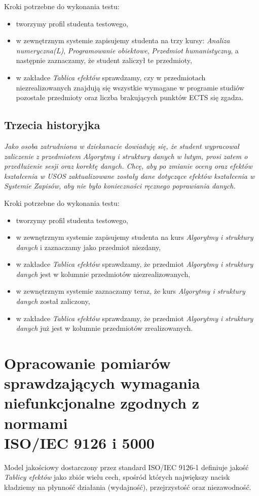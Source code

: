 \documentclass{article}
\begin{document}
\medskip
\noindent Kroki potrzebne do wykonania testu:
\begin{itemize}
 \item tworzymy profil studenta testowego,
 \item w zewnętrznym systemie zapisujemy studenta na trzy kursy: \textit{Analiza numeryczna(L)}, \textit{Programowanie obiektowe}, \textit{Przedmiot humanistyczny}, a następnie zaznaczamy, że student zaliczył te przedmioty,
 \item w zakładce \textit{Tablica efektów} sprawdzamy, czy w przedmiotach niezrealizowanych znajdują się wszystkie wymagane w programie studiów pozostałe przedmioty oraz
 liczba brakujących punktów ECTS się zgadza.
\end{itemize}

\subsection{Trzecia historyjka}
\textit{Jako osoba zatrudniona w dziekanacie dowiaduję się, że student wypracował zaliczenie z przedmiotem \textnormal{Algorytmy i struktury danych} w lutym, prosi zatem o przedłużenie sesji oraz korektę danych. 
Chcę, aby po zmianie oceny oraz efektów kształcenia w USOS zaktualizowane zostały dane dotyczące efektów kształcenia w Systemie Zapisów, aby nie było konieczności ręcznego poprawiania danych.}

\medskip
\noindent Kroki potrzebne do wykonania testu:
\begin{itemize}
 \item tworzymy profil studenta testowego,
 \item w zewnętrznym systemie zapisujemy studenta na kurs \textit{Algorytmy i struktury danych} i zaznaczamy jako przedmiot niezdany,
 \item w zakładce \textit{Tablica efektów} sprawdzamy, że przedmiot \textit{Algorytmy i struktury danych} jest w kolumnie przedmiotów niezrealizowanych,
 \item w zewnętrznym systemie zaznaczamy teraz, że kurs \textit{Algorytmy i struktury danych} został zaliczony,
 \item w zakładce \textit{Tablica efektów} sprawdzamy, że przedmiot \textit{Algorytmy i struktury danych} już jest w kolumnie przedmiotów zrealizowanych.
\end{itemize}

\section{Opracowanie pomiarów sprawdzających wymagania niefunkcjonalne zgodnych z normami \\ISO/IEC 9126 i 5000}
Model jakościowy dostarczony przez standard ISO/IEC 9126-1 definiuje jakość \textit{Tablicy efektów} jako zbiór wielu cech, spośród których największy nacisk kładziemy na płynność działania (wydajność), przejrzystość oraz niezawodność.
\end{document}
